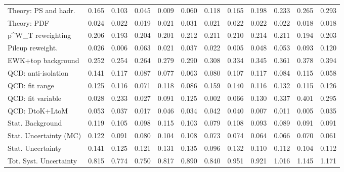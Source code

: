 \begin{tabular}{l|p{0.6cm}p{0.6cm}p{0.6cm}p{0.6cm}p{0.6cm}p{0.6cm}p{0.6cm}p{0.6cm}p{0.6cm}p{0.6cm}p{0.6cm}}
Theory: PS and hadr.                     & 0.165 & 0.103 & 0.045 & 0.009 & 0.060 & 0.118 & 0.165 & 0.198 & 0.233 & 0.265 & 0.293 \\
Theory: PDF                              & 0.024 & 0.022 & 0.019 & 0.021 & 0.031 & 0.021 & 0.022 & 0.022 & 0.022 & 0.018 & 0.018 \\
p^{W}_{T} reweighting                    & 0.206 & 0.193 & 0.204 & 0.201 & 0.212 & 0.211 & 0.210 & 0.214 & 0.211 & 0.194 & 0.203 \\
Pileup reweight.                         & 0.026 & 0.006 & 0.063 & 0.021 & 0.037 & 0.022 & 0.005 & 0.048 & 0.053 & 0.093 & 0.120 \\
EWK+top background                       & 0.252 & 0.254 & 0.264 & 0.279 & 0.290 & 0.308 & 0.334 & 0.345 & 0.361 & 0.378 & 0.394 \\
QCD: anti-isolation                      & 0.141 & 0.117 & 0.087 & 0.077 & 0.063 & 0.080 & 0.107 & 0.117 & 0.084 & 0.115 & 0.058 \\
QCD: fit range                           & 0.125 & 0.116 & 0.071 & 0.118 & 0.086 & 0.159 & 0.140 & 0.116 & 0.132 & 0.115 & 0.126 \\
QCD: fit variable                        & 0.028 & 0.233 & 0.027 & 0.091 & 0.125 & 0.002 & 0.066 & 0.130 & 0.337 & 0.401 & 0.295 \\
QCD: DtoK+LtoM                           & 0.053 & 0.037 & 0.017 & 0.046 & 0.034 & 0.042 & 0.040 & 0.007 & 0.011 & 0.005 & 0.035 \\
Stat. Background                         & 0.119 & 0.105 & 0.098 & 0.115 & 0.103 & 0.079 & 0.108 & 0.093 & 0.089 & 0.091 & 0.091 \\
Stat. Uncertainty (MC)                   & 0.122 & 0.091 & 0.080 & 0.104 & 0.108 & 0.073 & 0.074 & 0.064 & 0.066 & 0.070 & 0.061 \\
\hline
Stat. Uncertainty                        & 0.141 & 0.125 & 0.121 & 0.131 & 0.135 & 0.096 & 0.132 & 0.110 & 0.112 & 0.104 & 0.112 \\
\hline
Tot. Syst. Uncertainty                   & 0.815 & 0.774 & 0.750 & 0.817 & 0.890 & 0.840 & 0.951 & 0.921 & 1.016 & 1.145 & 1.171 \\
\hline
\end{tabular}
